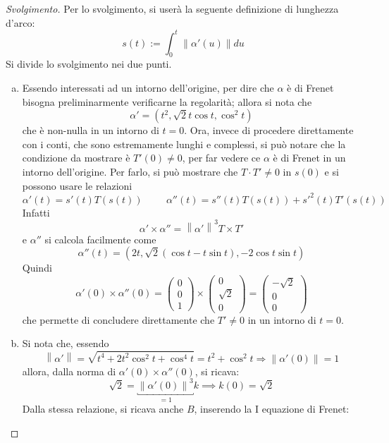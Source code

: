 \documentclass[12pt]{scrartcl}
\theoremstyle{style}
\newenvironment{svolgimento}{\renewcommand\qedsymbol{$\blacksquare$}\begin{proof}[Svolgimento]}{\end{proof}}
\numberwithin{equation}{subsection}
\begin{document}
\begin{svolgimento} Per lo svolgimento, si user\`a la seguente definizione di lunghezza d'arco:
	\[
	s(t) := \int_{0} ^t \left\lVert \alpha '(u) \right\rVert du
	\] 
	Si divide lo svolgimento nei due punti.
	\begin{enumerate}[(a).]
		\item Essendo interessati ad un intorno dell'origine, per dire che $\alpha $ \`e di Frenet bisogna preliminarmente verificarne la regolarit\`a; allora si nota che
			\[
			\alpha ' = \left(t^2 , \sqrt{2} t \cos t, \cos^2 t\right) 
			\] 
			che \`e non-nulla in un intorno di $t=0$.  
			Ora, invece di procedere direttamente con i conti, che sono estremamente lunghi e complessi, si pu\`o notare che la condizione da mostrare \`e $T'(0) \neq 0$, per far vedere ce $\alpha $ \`e di Frenet in un intorno dell'origine.
			Per farlo, si pu\`o mostrare che $T \cdot T' \neq 0$ in $s(0)$ e si possono usare le relazioni
			\[
			\alpha ' (t) = s'(t) T(s(t)) \hspace{1cm}\alpha ''(t) =s''(t)T(s(t)) + s'^2 (t) T'(s(t))
			\] 
			Infatti
			\[
			\alpha ' \times \alpha '' = \left\lVert \alpha ' \right\rVert ^3 T \times T'
			\] 
			e $\alpha ''$ si calcola facilmente come
			\[
			\alpha ''(t)  =\left(2t , \sqrt{2} (\cos t - t \sin t),-2 \cos t \sin t\right) 
			\] 
			Quindi 
			\[
			\alpha '(0) \times  \alpha ''(0) = \begin{pmatrix} 0\\ 0 \\ 1  \end{pmatrix} \times \begin{pmatrix} 0 \\\sqrt{2} \\0 \end{pmatrix} = \begin{pmatrix} -\sqrt{2} \\ 0 \\ 0 \end{pmatrix} 
			\] 
		che permette di concludere direttamente che $T' \neq 0$ in un intorno di $t=0$.
	\item 	Si nota che, essendo 
		\[
		\left\lVert \alpha ' \right\rVert = \sqrt{t^4 + 2 t^2 \cos^2 t + \cos^4 t} = t^2 + \cos^2 t \Rightarrow \left\lVert \alpha '(0) \right\rVert = 1
		\] 
		allora, dalla norma di $\alpha '(0) \times \alpha ''(0)$, si ricava:
		\[
		\sqrt{2} = \underbracket{\left\lVert \alpha '(0) \right\rVert ^3}_{=1} k\implies k(0) = \sqrt{2} 
		\] 
		Dalla stessa relazione, si ricava anche $B$, inserendo la I equazione di Frenet:

\end{enumerate}
\end{svolgimento}
\end{document}
